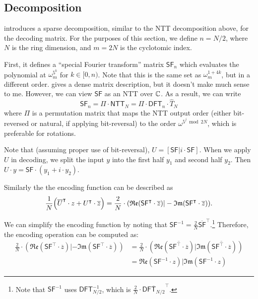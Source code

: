 \documentclass[../fheimpl.tex]{subfiles}
\begin{document}
    \subsection{Decomposition}
    \label{sec:sfdecomp}
    \cite{cryptoeprint:2018/1043} introduces a sparse decomposition, similar to the NTT decomposition above, for the decoding matrix. For the purposes of this section, we define $n=N/2$, where $N$ is the ring dimension, and $m=2N$ is the cyclotomic index.

    First, it defines a ``special Fourier transform'' matrix $\mathsf{SF}_n$ which evaluates the polynomial at $\omega_m^{5^k}$ for $k\in[0, n)$. Note that this is the same set as $\omega_m^{1+4k}$, but in a different order. \cite{cryptoeprint:2018/1043} gives a dense matrix description, but it doesn't make much sense to me. However, we can view $\mathsf{SF}$ as an NTT over $\mathbb{C}$. As a result, we can write
    \[\mathsf{SF}_n = \Pi\cdot \mathsf{NTT}_N = \Pi\cdot \mathsf{DFT}_n \cdot \hat{T}_N\]
    where $\Pi$ is a permutation matrix that maps the NTT output order (either bit-reversed or natural, if applying bit-reversal) to the order $\omega^{5^j \bmod 2N}$, which is preferable for rotations.    
    

    Note that (assuming proper use of bit-reversal), $U=[\mathsf{SF} | i\cdot \mathsf{SF}]$. When we apply $U$ in decoding, we split the input $y$ into the first half $y_1$ and second half $y_2$. Then $U\cdot y = \mathsf{SF}\cdot (y_1+i\cdot y_2)$.

    Similarly the the encoding function can be described as
    \[\frac{1}{N}\parens*{\overline{U}^\intercal\cdot z+U^\intercal \cdot \overline{z}} = \frac{2}{N}\cdot (\mathfrak{Re}(\mathsf{SF}^\intercal\cdot \overline{z}) | -\mathfrak{Im}(\mathsf{SF}^\intercal\cdot \overline{z})).\]
    
    We can simplify the encoding function by noting that $\mathsf{SF}^{-1} = \frac{2}{N}\overline{\mathsf{SF}}^\intercal$.\footnote{Note that $\mathsf{SF}^{-1}$ uses $\mathsf{DFT}_{N/2}^{-1}$, which is $\frac{2}{N}\cdot \overline{\mathsf{DFT}_{N/2}}^\intercal$.} Therefore, the encoding operation can be computed as:
    \begin{align}
    	\frac{2}{N}\cdot (\mathfrak{Re}(\mathsf{SF}^\intercal\cdot \overline{z}) | -\mathfrak{Im}(\mathsf{SF}^\intercal\cdot \overline{z})) &= \frac{2}{N}\cdot (\mathfrak{Re}(\overline{\mathsf{SF}^\intercal\cdot \overline{z}}) | \mathfrak{Im}(\overline{\mathsf{SF}^\intercal\cdot \overline{z}})) \\
    	&= \mathfrak{Re}(\mathsf{SF}^{-1}\cdot z) | \mathfrak{Im}(\mathsf{SF}^{-1}\cdot z)
    \end{align}
    
\end{document}
